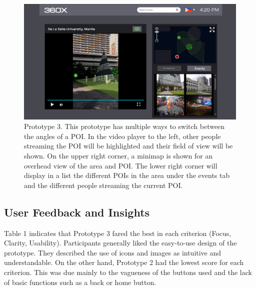 \documentclass{sigchi}
\begin{document}
\begin{figure}[h]
    \centering
    \includegraphics[width = 1\linewidth]{figures/Prototype_3.png}
    \caption{Prototype 3. This prototype has multiple ways to switch between the angles of a POI. In the video player to the left, other people streaming the POI will be highlighted and their field of view will be shown. On the upper right corner, a minimap is shown for an overhead view of the area and POI. The lower right corner will display in a list the different POIs in the area under the events tab and the different people streaming the current POI.}
    \label{fig:multiple}
\end{figure}
\newpage
\subsection{User Feedback and Insights}
Table 1 indicates that Prototype 3 fared the best in each criterion (Focus, Clarity, Usability). Participants generally liked the easy-to-use design of the prototype. They described the use of icons and images as intuitive and understandable. On the other hand, Prototype 2 had the lowest score for each criterion. This was due mainly to the vagueness of the buttons used and the lack of basic functions such as a back or home button.

\end{document}
